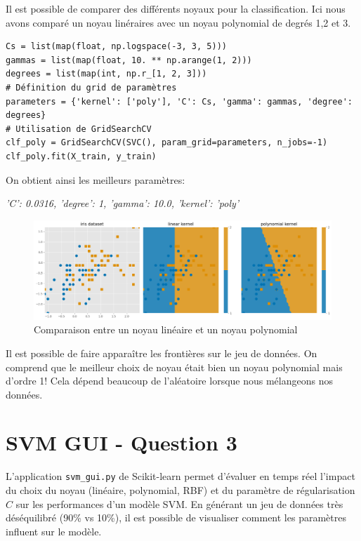 \documentclass[11pt,a4paper]{article}
\begin{document}
Il est possible de comparer des différents noyaux pour la classification. Ici nous avons comparé un noyau linéraires avec un noyau polynomial de degrés 1,2 et 3. 

\begin{verbatim}
Cs = list(map(float, np.logspace(-3, 3, 5)))
gammas = list(map(float, 10. ** np.arange(1, 2)))
degrees = list(map(int, np.r_[1, 2, 3]))
# Définition du grid de paramètres
parameters = {'kernel': ['poly'], 'C': Cs, 'gamma': gammas, 'degree': degrees}
# Utilisation de GridSearchCV
clf_poly = GridSearchCV(SVC(), param_grid=parameters, n_jobs=-1)
clf_poly.fit(X_train, y_train)
\end{verbatim}



On obtient ainsi les meilleurs paramètres:

\textit{'C': 0.0316, 'degree': 1, 'gamma': 10.0, 'kernel': 'poly'}

\pagebreak
\begin{figure}[H]
    \centering
    \includegraphics[width=1\linewidth]{images_plot/compar_lin_poly.png}
    \caption{Comparaison entre un noyau linéaire et un noyau polynomial}
    \label{fig1}
\end{figure}

Il est possible de faire apparaître les frontières sur le jeu de données. On comprend que le meilleur choix de noyau était bien un noyau polynomial mais d'ordre 1! Cela dépend beaucoup de l'aléatoire lorsque nous mélangeons nos données.

\section{SVM GUI - Question 3}

L'application \texttt{svm\_gui.py} de Scikit-learn permet d'évaluer en temps réel l'impact du choix du noyau (linéaire, polynomial, RBF) et du paramètre de régularisation \(C\) sur les performances d'un modèle SVM. En générant un jeu de données très déséquilibré (90\% vs 10\%), il est possible de visualiser comment les paramètres influent sur le modèle.
\end{document}
